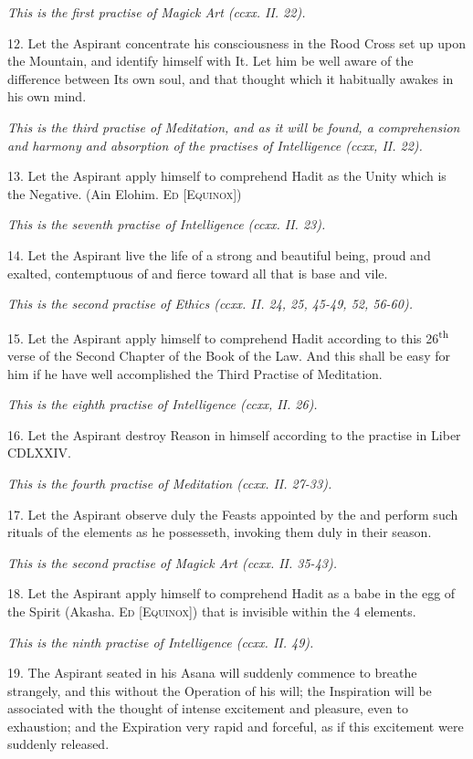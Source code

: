 \textit{This is the first practise of Magick Art (ccxx. II. 22).}

12. Let the Aspirant concentrate his consciousness in the Rood Cross set up upon the Mountain, and identify himself with It. Let him be well aware of the difference between Its own soul, and that thought which it habitually awakes in his own mind.

\textit{This is the third practise of Meditation, and as it will be found, a comprehension and harmony and absorption of the practises of Intelligence (ccxx, II. 22).}

13. Let the Aspirant apply himself to comprehend Hadit as the Unity which is the Negative. (Ain Elohim. \textsc{Ed [Equinox]})

\textit{This is the seventh practise of Intelligence (ccxx. II. 23).}

14. Let the Aspirant live the life of a strong and beautiful being, proud and exalted, contemptuous of and fierce toward all that is base and vile.

\textit{This is the second practise of Ethics (ccxx. II. 24, 25, 45-49, 52, 56-60).}

15. Let the Aspirant apply himself to comprehend Hadit according to this 26\textsuperscript{th} verse of the Second Chapter of the Book of the Law. And this shall be easy for him if he have well accomplished the Third Practise of Meditation.

\textit{This is the eighth practise of Intelligence (ccxx, II. 26).}

16. Let the Aspirant destroy Reason in himself according to the practise in Liber CDLXXIV.

\textit{This is the fourth practise of Meditation (ccxx. II. 27-33).}

17.
Let the Aspirant observe duly the Feasts appointed by the \Argentium{} and perform such rituals of the elements as he possesseth, invoking them duly in their season.

\textit{This is the second practise of Magick Art (ccxx. II. 35-43).}

18. Let the Aspirant apply himself to comprehend Hadit as a babe in the egg of the Spirit (Akasha. \textsc{Ed [Equinox]}) that is invisible within the 4 elements.

\textit{This is the ninth practise of Intelligence (ccxx. II. 49).}

19. The Aspirant seated in his Asana will suddenly commence to breathe strangely, and this without the Operation of his will; the Inspiration will be associated with the thought of intense excitement and pleasure, even to exhaustion; and the Expiration very rapid and forceful, as if this excitement were suddenly released.

